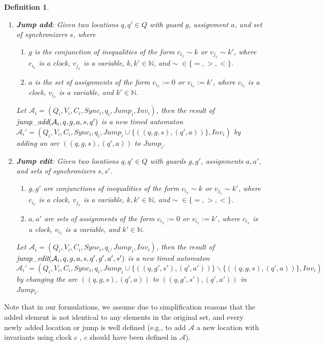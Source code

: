 \documentclass[10pt, a4paper, onecolumn, conference, compsocconf]{IEEEtran}
\newcommand{\emjadd}{\mbox{\em jump\_add}}
\newcommand{\emjedt}{\mbox{\em jump\_edit}}
\newtheorem{defi}{Definition}
\begin{document}
\begin{defi}
\begin{enumerate}
\item \textbf{Jump add}:
    Given two locations $q,q'\in Q$ with guard $g$, assignment $a$, and set of synchronizers $s$, where
    \begin{enumerate}
    \item $g$ is the conjunction of inequalities of the form $c_{i_x} \sim k$ or $v_{j_x} \sim k'$, where $c_{i_x}$ is a clock, $v_{j_x}$ is a variable, $k,k' \in \mathbb{N}$, and $\sim\; \in\{=,>,<\}$.
    \item $a$ is the set of assignments of the form $c_{i_x} := 0$ or $v_{i_x} := k'$, where $c_{i_x}$ is a clock, $v_{i_x}$ is a variable, and $k' \in \mathbb{N}$.
    \end{enumerate}
    Let $\mathcal{A}_i = (Q_i, V_i, C_i, Sync_i,q_i,Jump_i, Inv_i)$, then the result of $\emjadd(\mathcal{A}_i ,q,g, a,s,q')$ is a
    new timed automaton $\mathcal{A}_i' = (Q_i, V_i, C_i, Sync_i, q_i, Jump_i\cup\{((q,g,s),(q',a))\}, Inv_i)$ by adding an arc $((q,g,s),(q',a))$ to $Jump_i$.
\item \textbf{Jump edit}:
    Given two locations $q,q'\in Q$ with guards $g,g'$, assignments $a,a'$, and sets of synchronizers $s,s'$.
    \begin{enumerate}
    \item $g, g'$ are conjunctions of inequalities of the form $c_{i_x} \sim k$ or $v_{j_x} \sim k'$, where $c_{i_x}$ is a clock, $v_{j_x}$ is a variable, $k,k' \in \mathbb{N}$, and $\sim\; \in\{=,>,<\}$.
    \item $a, a'$ are sets of assignments of the form $c_{i_x} := 0$ or $v_{i_x} := k'$, where $c_{i_x}$ is a clock, $v_{i_x}$ is a variable, and $k' \in \mathbb{N}$.
    \end{enumerate}
    Let $\mathcal{A}_i = (Q_i, V_i, C_i, Sync_i,q_i,Jump_i, Inv_i)$, then the result of $\emjedt(\mathcal{A}_i ,q,g, a,s,q',g',a',s')$ is a new timed automaton
    $\mathcal{A}_i' = (Q_i, V_i, C_i, Sync_i, q_i, Jump_i\cup\{((q,g',s'),(q',a'))\}\backslash\{((q,g,s),(q',a))\}, Inv_i)$ by changing the arc $((q,g,s),(q',a))$ to $((q,g',s'),(q',a'))$ in $Jump_i$.
\end{enumerate}
\end{defi}

Note that in our formulations, we assume due to simplification reasons that the added element is not identical to any elements in the original set, and
every newly added location or jump is well defined (e.g., to add $\mathcal{A}$ a new location with invariants using clock $c$ , $c$ should have been
defined in $\mathcal{A}$).
\end{document}
